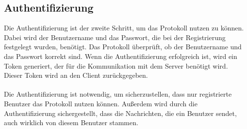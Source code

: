 \subsection{Authentifizierung}

Die Authentifizierung ist der zweite Schritt, um das Protokoll nutzen zu können. 
Dabei wird der Benutzername und das Passwort, die bei der Registrierung festgelegt wurden,
benötigt. Das Protokoll überprüft, ob der Benutzername und das Passwort korrekt sind.
Wenn die Authentifizierung erfolgreich ist, wird ein Token generiert, der für die
Kommunikation mit dem Server benötigt wird. Dieser Token wird an den Client zurückgegeben.
\\
\\
\noindent Die Authentifizierung ist notwendig, um sicherzustellen, dass nur registrierte Benutzer
das Protokoll nutzen können. Außerdem wird durch die Authentifizierung sichergestellt, dass
die Nachrichten, die ein Benutzer sendet, auch wirklich von diesem Benutzer stammen.